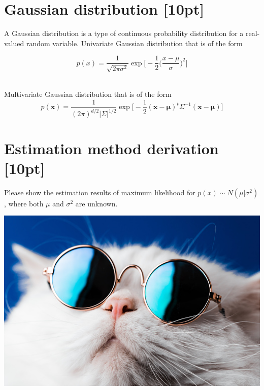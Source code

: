 \documentclass{article}
\begin{document}
\section{Gaussian distribution [10pt]}

A Gaussian distribution is a type of continuous probability distribution for a
real-valued random variable. Univariate Gaussian distribution that is of the form

\begin{equation}
    p(x) = \frac{1}{\sqrt{2\pi\sigma^2}}\exp{\bigg[ -\frac{1}{2} \bigg( \frac{x-\mu}{\sigma} \bigg)^2 \bigg]}
\end{equation} \\
\newline

\noindent Multivariate Gaussian distribution that is of the form
\begin{equation}
    p(\bm{x}) = \frac{1}{(2\pi)^{d/2} |\Sigma|^{1/2}}\exp{\bigg [-\frac{1}{2}(\bm{x -\mu})^t\Sigma^{-1}(\bm{x-\mu}) \bigg]}
\end{equation}

\newpage
\section{Estimation method derivation [10pt]}
\begin{center}
Please show the estimation results of maximum likelihood for $p(x) \sim N(\mu|\sigma^2)$, where both $\mu$ and $\sigma^2$ are unknown.
\end{center}
\includegraphics[width=\textwidth]{cool_cat}
\end{document}
